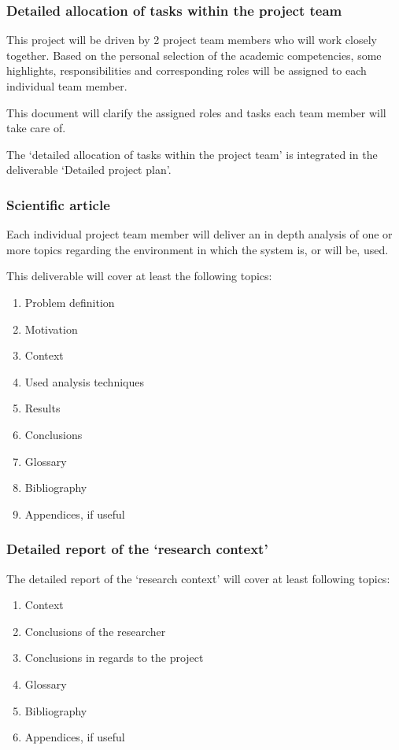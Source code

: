 \subsubsection{Detailed allocation of tasks within the project team}
This project will be driven by 2 project team members who will work closely together.
Based on the personal selection of the  academic competencies, some highlights, responsibilities and corresponding roles will be assigned to each individual team member.

This document will clarify the assigned roles and tasks each team member will take care of.

The `detailed allocation of tasks within the project team' is integrated in the deliverable `Detailed project plan'.

\subsubsection{Scientific article}
Each individual project team member will deliver an in depth analysis of one or more topics regarding the environment in which the system is, or will be, used.

This deliverable will cover at least the following topics:

	\begin{enumerate}
		\item Problem definition
		\item Motivation
		\item Context
		\item Used analysis techniques
		\item Results
		\item Conclusions
		\item Glossary
		\item Bibliography
		\item Appendices, if useful
	\end {enumerate}

\subsubsection{Detailed report of the `research context'}
The detailed report of the `research context' will cover at least following topics:

	\begin{enumerate}
		\item Context
		\item Conclusions of the researcher
		\item Conclusions in regards to the project
		\item Glossary
		\item Bibliography
		\item Appendices, if useful
	\end {enumerate}

